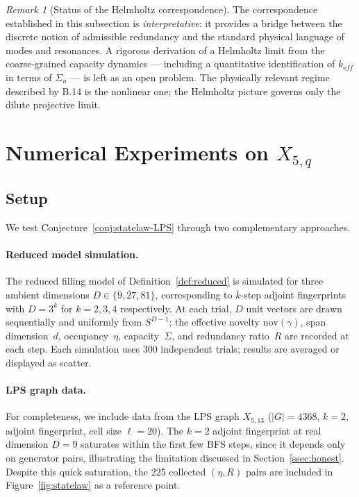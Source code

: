 \documentclass[11pt,a4paper]{article}
\theoremstyle{definition}
\theoremstyle{remark}
\newtheorem{remark}[theorem]{Remark}
\newcommand{\nov}{\mathrm{nov}}
\begin{document}
      \begin{remark}[Status of the Helmholtz correspondence]
        \label{rem:helmholtz-status}
        The correspondence established in this subsection is \emph{interpretative}:
        it provides a bridge between the discrete notion of admissible redundancy and the
        standard physical language of modes and resonances.
        A rigorous derivation of a Helmholtz limit from the coarse-grained capacity dynamics ---
        including a quantitative identification of $k_{\mathrm eff}$ in terms of $\Sigma_n$ ---
        is left as an open problem.
        The physically relevant regime described by B.14 is the nonlinear one;
        the Helmholtz picture governs only the dilute projective limit.
      \end{remark}

  \section{Numerical Experiments on $X_{5,q}$}
  \label{sec:numerical}

  \subsection{Setup}
    \label{ssec:num-setup}

    We test Conjecture~\ref{conj:statelaw-LPS} through two complementary approaches.

    \paragraph{Reduced model simulation.}
      The reduced filling model of Definition~\ref{def:reduced} is simulated for three ambient
      dimensions $D \in \{9, 27, 81\}$, corresponding to $k$-step adjoint fingerprints with
      $D = 3^k$ for $k = 2, 3, 4$ respectively.
      At each trial, $D$ unit vectors are drawn sequentially and uniformly from $S^{D-1}$;
      the effective novelty $\nov(\gamma)$, span dimension~$d$, occupancy~$\eta$,
      capacity~$\Sigma$, and redundancy ratio~$R$ are recorded at each step.
      Each simulation uses 300 independent trials; results are averaged or displayed as scatter.

    \paragraph{LPS graph data.}
      For completeness, we include data from the LPS graph $X_{5,13}$
      ($|G| = 4368$, $k=2$, adjoint fingerprint, cell size $\ell = 20$).
      The $k=2$ adjoint fingerprint at real dimension $D=9$ saturates within the first few
      BFS steps, since it depends only on generator pairs, illustrating the limitation
      discussed in Section~\ref{ssec:honest}.
      Despite this quick saturation, the 225 collected $({\eta},R)$ pairs are included
      in Figure~\ref{fig:statelaw} as a reference point.
\end{document}
